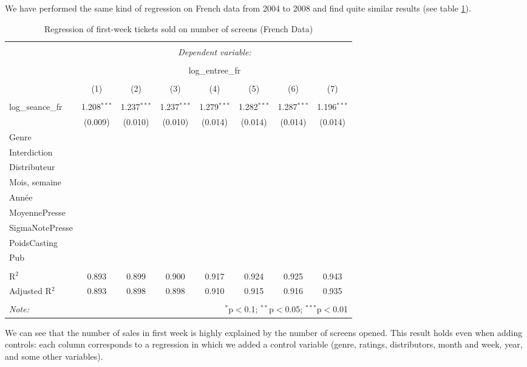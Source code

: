 We have performed the same kind of regression on French data from 2004 to 2008 and find quite similar results (see table \ref{part2.1_tab3}).
\begin{table}[!htbp] \centering 
	\caption{Regression of first-week tickets sold on number of screens (French Data)} 
	\label{part2.1_tab3} 
	\begin{tabular}{@{\extracolsep{0pt}}lccccccc} 
		\\[-1.8ex]\hline 
		\hline \\[-1.8ex] 
		& \multicolumn{7}{c}{\textit{Dependent variable:}} \\ 
		\cline{2-8} 
		\\[-1.8ex] & \multicolumn{7}{c}{log\_entree\_fr} \\ 
		\\[-1.8ex] & (1) & (2) & (3) & (4) & (5) & (6) & (7)\\ 
		\hline \\[-1.8ex] 
		log\_seance\_fr & 1.208$^{***}$ & 1.237$^{***}$ & 1.237$^{***}$ & 1.279$^{***}$ & 1.282$^{***}$ & 1.287$^{***}$ & 1.196$^{***}$ \\ 
		& (0.009) & (0.010) & (0.010) & (0.014) & (0.014) & (0.014) & (0.014) \\ 
		Genre & & \checkmark & \checkmark & \checkmark & \checkmark & \checkmark & \checkmark \\
		Interdiction & && \checkmark & \checkmark & \checkmark & \checkmark & \checkmark \\
		Distributeur & &&& \checkmark & \checkmark & \checkmark & \checkmark \\
		Mois, semaine &&&&& \checkmark & \checkmark & \checkmark \\
		Année &&&&&& \checkmark & \checkmark \\
		MoyennePresse &&&&&&& \checkmark \\
		SigmaNotePresse &&&&&&& \checkmark \\
		PoidsCasting &&&&&&& \checkmark \\
		Pub &&&&&&& \checkmark \\
		\hline \\[-1.8ex] 
		R$^{2}$ & 0.893 & 0.899 & 0.900 & 0.917 & 0.924 & 0.925 & 0.943 \\ 
		Adjusted R$^{2}$ & 0.893 & 0.898 & 0.898 & 0.910 & 0.915 & 0.916 & 0.935 \\ 
		\hline 
		\hline \\[-1.8ex] 
		\textit{Note:}  & \multicolumn{7}{r}{$^{*}$p$<$0.1; $^{**}$p$<$0.05; $^{***}$p$<$0.01} \\ 
	\end{tabular} 
\end{table} 
We can see that the number of sales in first week is highly explained by the number of screens opened. This result holds even when adding controls: each column corresponds to a regression in which we added a control variable (genre, ratings, distributors, month and week, year, and some other variables).  


